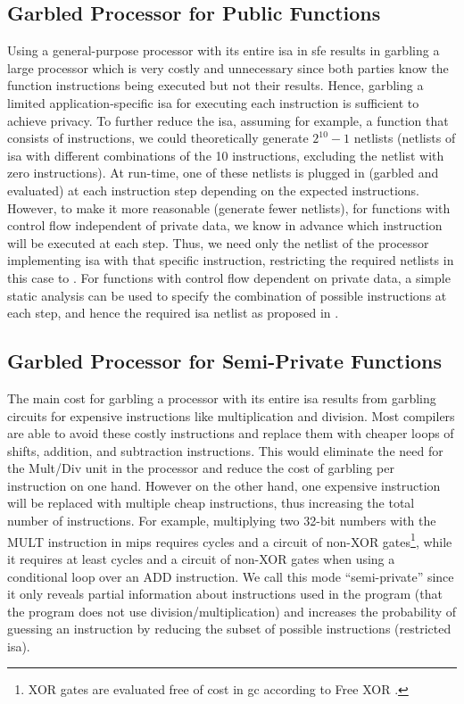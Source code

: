 \subsection{Garbled Processor for Public Functions}\label{ssec:processor-mips-sfe-public}
Using a general-purpose processor with its entire \acrshort{isa} in \acrshort{sfe} results in garbling a large processor which is very costly and unnecessary since both parties know the function instructions being executed but not their results.
Hence, garbling a limited application-specific \acrshort{isa} for executing each instruction is sufficient to achieve privacy.
To further reduce the \acrshort{isa}, assuming for example, a function that consists of  instructions, we could theoretically generate $2^{10} -1$ netlists (netlists of \acrshort{isa} with different combinations of the 10 instructions, excluding the netlist with zero instructions).
At run-time, one of these netlists is plugged in (garbled and evaluated) at each instruction step depending on the expected instructions.
However, to make it more reasonable (generate fewer netlists), for functions with control flow independent of private data, we know in advance which instruction will be executed at each step.
Thus, we need only the netlist of the processor implementing \acrshort{isa} with that specific instruction, restricting the required netlists in this case to .
For functions with control flow dependent on private data, a simple static analysis can be used to specify the combination of possible instructions at each step, and hence the required \acrshort{isa} netlist as proposed in \cite{wang2016secure}.

\subsection{Garbled Processor for Semi-Private Functions}\label{ssec:processor-mips-sfe-semiprivate}
The main cost for garbling a processor with its entire \acrshort{isa} results from garbling circuits for expensive instructions like multiplication and division.
Most compilers are able to avoid these costly instructions and replace them with cheaper loops of shifts, addition, and subtraction instructions.
This would eliminate the need for the Mult/Div unit in the processor and reduce the cost of garbling per instruction on one hand.
However on the other hand, one expensive instruction will be replaced with multiple cheap instructions, thus increasing the total number of instructions.
For example, multiplying two 32-bit numbers with the MULT instruction in \gls{mips} requires  cycles and a circuit of  non-XOR gates\footnote{XOR gates are evaluated free of cost in \acrshort{gc} according to Free XOR \cite{kolesnikov2008improved}.}, while it requires at least  cycles and a circuit of  non-XOR gates when using a conditional loop over an ADD instruction.
We call this mode ``semi-private'' since it only reveals partial information about instructions used in the program (that the program does not use division/multiplication) and increases the probability of guessing an instruction by reducing the subset of possible instructions (restricted \acrshort{isa}).

